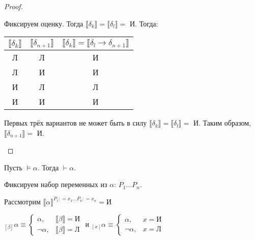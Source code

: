 \begin{proof}
\begin{enumerate}
              Фиксируем оценку. Тогда \(\llbracket \delta_k \rrbracket = \llbracket \delta_l \rrbracket =\) И. Тогда:

              \begin{center}
                  \begin{tabular}{c|c|c}
                      \(\llbracket \delta_k \rrbracket\) & \(\llbracket \delta_{n + 1} \rrbracket \) & \(\llbracket \delta_k \rrbracket = \llbracket \delta_l \to \delta_{n + 1} \rrbracket\) \\ \hline
                      Л                                  & Л                                         & И                                                                                      \\
                      Л                                  & И                                         & И                                                                                      \\
                      И                                  & Л                                         & Л                                                                                      \\
                      И                                  & И                                         & И                                                                                      \\
                  \end{tabular}
              \end{center}

              Первых трёх вариантов не может быть в силу \(\llbracket \delta_k \rrbracket = \llbracket \delta_l \rrbracket =\) И. Таким образом, \(\llbracket \delta_{n + 1} \rrbracket = \) И.
    \end{enumerate}
\end{proof}

\begin{theorem}[о полноте]
    Пусть \(\models \alpha\). Тогда \(\vdash \alpha\).
\end{theorem}

Фиксируем набор переменных из \(\alpha\): \(P_1 \dots P_n\).

Рассмотрим \(\llbracket \alpha \rrbracket^{P_1 : = x_1 \dots P_n: = x_n} = \text{И}\)

\begin{obozn}
    \({}_{[\beta]} \alpha \equiv \begin{cases}
        \alpha,      & \llbracket \beta \rrbracket = \text{И} \\
        \neg \alpha, & \llbracket \beta \rrbracket = \text{Л}
    \end{cases}\) и \({}_{[x]} \alpha \equiv \begin{cases}
        \alpha,      & x = \text{И} \\
        \neg \alpha, & x = \text{Л}
    \end{cases}\)
\end{obozn}

